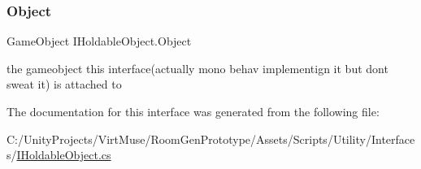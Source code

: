 \subsubsection{\texorpdfstring{Object}{Object}}
{\footnotesize\ttfamily Game\+Object I\+Holdable\+Object.\+Object\hspace{0.3cm}{\ttfamily [get]}}



the gameobject this interface(actually mono behav implementign it but don\textquotesingle{}t sweat it) is attached to 



The documentation for this interface was generated from the following file\+:\begin{DoxyCompactItemize}
\item 
C\+:/\+Unity\+Projects/\+Virt\+Muse/\+Room\+Gen\+Prototype/\+Assets/\+Scripts/\+Utility/\+Interfaces/\mbox{\hyperlink{_i_holdable_object_8cs}{I\+Holdable\+Object.\+cs}}\end{DoxyCompactItemize}
